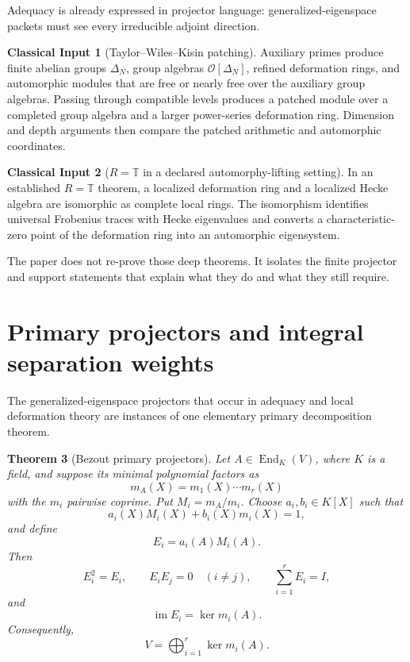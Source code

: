 \documentclass[11pt]{article}
\newtheorem{theorem}{Theorem}[section]
\theoremstyle{definition}
\newtheorem{classicalinput}[theorem]{Classical Input}
\theoremstyle{remark}
\newcommand{\Ocal}{\mathcal O}
\newcommand{\End}{\operatorname{End}}
\newcommand{\im}{\operatorname{im}}
\newcommand{\T}{\mathbb T}
\begin{document}
Adequacy is already expressed in projector language: generalized-eigenspace packets must see every irreducible adjoint direction.

\begin{classicalinput}[Taylor--Wiles--Kisin patching]
Auxiliary primes produce finite abelian groups $\Delta_N$, group algebras $\Ocal[\Delta_N]$, refined deformation rings, and automorphic modules that are free or nearly free over the auxiliary group algebras.  Passing through compatible levels produces a patched module over a completed group algebra and a larger power-series deformation ring.  Dimension and depth arguments then compare the patched arithmetic and automorphic coordinates.
\end{classicalinput}

\begin{classicalinput}[$R=\T$ in a declared automorphy-lifting setting]
In an established $R=\T$ theorem, a localized deformation ring and a localized Hecke algebra are isomorphic as complete local rings.  The isomorphism identifies universal Frobenius traces with Hecke eigenvalues and converts a characteristic-zero point of the deformation ring into an automorphic eigensystem.
\end{classicalinput}

The paper does not re-prove those deep theorems.  It isolates the finite projector and support statements that explain what they do and what they still require.

\section{Primary projectors and integral separation weights}

The generalized-eigenspace projectors that occur in adequacy and local deformation theory are instances of one elementary primary decomposition theorem.

\begin{theorem}[Bezout primary projectors]
Let $A\in\End_K(V)$, where $K$ is a field, and suppose its minimal polynomial factors as
\[
m_A(X)=m_1(X)\cdots m_r(X)
\]
with the $m_i$ pairwise coprime.  Put $M_i=m_A/m_i$.  Choose $a_i,b_i\in K[X]$ such that
\[
a_i(X)M_i(X)+b_i(X)m_i(X)=1,
\]
and define
\[
E_i=a_i(A)M_i(A).
\]
Then
\[
E_i^2=E_i,
\qquad
E_iE_j=0\quad(i\neq j),
\qquad
\sum_{i=1}^rE_i=I,
\]
and
\[
\im E_i=\ker m_i(A).
\]
Consequently,
\[
V=\bigoplus_{i=1}^r\ker m_i(A).
\]
\end{theorem}
\end{document}
